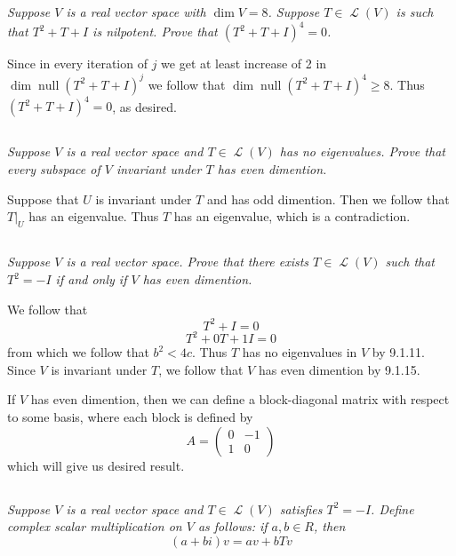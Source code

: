 \documentclass[11pt,oneside,titlepage]{book}
\DeclareMathOperator \map {\mathcal {L}}
\DeclareMathOperator \ns {null}
\begin{document}
\subsection{}

\textit{Suppose $V$ is a real vector space with $\dim V = 8$. Suppose $T \in \map(V)$ is
  such that $T^2 + T + I$ is nilpotent. Prove that $(T^2 + T + I)^4 = 0$.}

Since in every iteration of $j$ we get at least increase of 2 in $\dim \ns (T^2 + T + I)^{j}$
we follow that $\dim \ns (T^2 + T + I)^4 \geq 8$. Thus $(T^2 + T + I)^4 = 0$, as desired.

\subsection{}

\textit{Suppose $V$ is a real vector space and $T \in \map(V)$ has no eigenvalues. Prove that
  every subspace of $V$ invariant under $T$ has even dimention.}

Suppose that $U$ is invariant under $T$ and has odd dimention. Then we follow that
$T|_U$ has an eigenvalue. Thus $T$ has an eigenvalue, which is a contradiction.

\subsection{}

\textit{Suppose $V$ is a real vector space. Prove that there exists $T \in \map(V)$
  such that $T^2 = -I$ if and only if $V$ has even dimention.}

We follow that
$$T^2 + I = 0$$
$$T^2 + 0T + 1I = 0$$
from which we follow that $b^2 < 4c$. Thus $T$ has no eigenvalues in $V$ by 9.1.11.
Since $V$ is invariant under $T$, we follow that $V$ has even dimention by 9.1.15.

If $V$ has even dimention, then we can define a block-diagonal matrix with respect to some
basis, where each block is defined by
$$A =
\begin{pmatrix}
  0 & -1 \\
  1 & 0
\end{pmatrix}
$$
which will give us desired result.

\subsection{}

\textit{Suppose $V$ is a real vector space and $T \in \map(V)$ satisfies $T^2 = -I$.
  Define complex scalar multiplication on $V$ as follows: if $a, b \in R$, then
  $$(a + bi)v = av + bTv$$}
\end{document}
